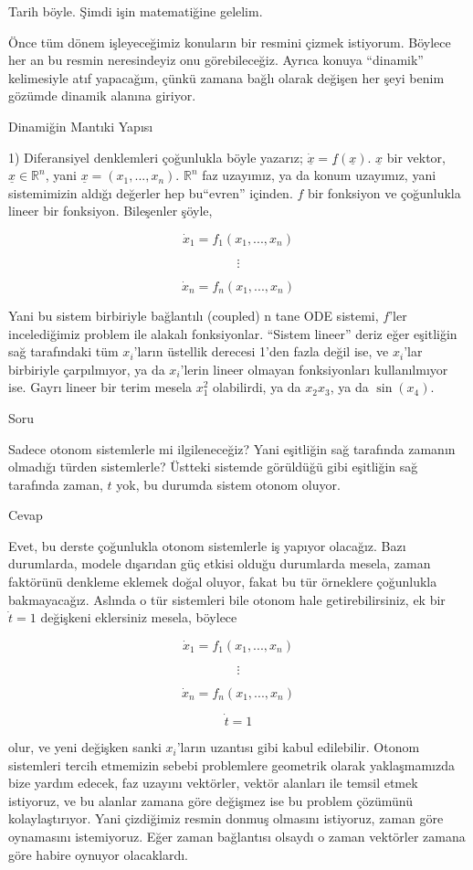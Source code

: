\documentclass[12pt,fleqn]{article}\usepackage{../../common}
\begin{document}
Tarih böyle. Şimdi işin matematiğine gelelim. 

Önce tüm dönem işleyeceğimiz konuların bir resmini çizmek istiyorum. Böylece her
an bu resmin neresindeyiz onu görebileceğiz. Ayrıca konuya ``dinamik''
kelimesiyle atıf yapacağım, çünkü zamana bağlı olarak değişen her şeyi benim
gözümde dinamik alanına giriyor.

Dinamiğin Mantıki Yapısı 

1) Diferansiyel denklemleri çoğunlukla böyle yazarız; $\dot{\underline{x}} =
\underline{f}(\underline{x}) $. $\underline{x}$ bir vektor, $ \underline{x} \in
\mathbb{R}^n$, yani $\underline{x} = (x_1,...,x_n)$. $\mathbb{R}^n$ faz uzayımız,
ya da konum uzayımız, yani sistemimizin aldığı değerler hep bu``evren''
içinden. $f$ bir fonksiyon ve çoğunlukla lineer bir fonksiyon. Bileşenler şöyle,

$$ \dot{x}_1 = f_1(x_1,...,x_n)$$

$$ \vdots $$

$$ \dot{x}_n = f_n(x_1,...,x_n)$$

Yani bu sistem birbiriyle bağlantılı (coupled) n tane ODE sistemi, $f$'ler
incelediğimiz problem ile alakalı fonksiyonlar. ``Sistem lineer'' deriz eğer
eşitliğin sağ tarafındaki tüm $x_i$'ların üstellik derecesi 1'den fazla değil
ise, ve $x_i$'lar birbiriyle çarpılmıyor, ya da $x_i$'lerin lineer olmayan
fonksiyonları kullanılmıyor ise. Gayrı lineer bir terim mesela $x_1^2$
olabilirdi, ya da $x_2x_3$, ya da $\sin(x_4)$.

Soru

Sadece otonom sistemlerle mi ilgileneceğiz? Yani eşitliğin sağ tarafında zamanın
olmadığı türden sistemlerle? Üstteki sistemde görüldüğü gibi eşitliğin sağ
tarafında zaman, $t$ yok, bu durumda sistem otonom oluyor.

Cevap

Evet, bu derste çoğunlukla otonom sistemlerle iş yapıyor olacağız. Bazı
durumlarda, modele dışarıdan güç etkisi olduğu durumlarda mesela, zaman
faktörünü denkleme eklemek doğal oluyor, fakat bu tür örneklere çoğunlukla
bakmayacağız. Aslında o tür sistemleri bile otonom hale getirebilirsiniz,
ek bir $\dot{t} = 1$ değişkeni eklersiniz mesela, böylece 

$$ \dot{x}_1 = f_1(x_1,...,x_n)$$

$$ \vdots $$

$$ \dot{x}_n = f_n(x_1,...,x_n)$$

$$ \dot{t} = 1$$

olur, ve yeni değişken sanki $x_i$'ların uzantısı gibi kabul
edilebilir. Otonom sistemleri tercih etmemizin sebebi problemlere geometrik
olarak yaklaşmamızda bize yardım edecek, faz uzayını vektörler, vektör
alanları ile temsil etmek istiyoruz, ve bu alanlar zamana göre değişmez ise
bu problem çözümünü kolaylaştırıyor. Yani çizdiğimiz resmin donmuş olmasını
istiyoruz, zaman göre oynamasını istemiyoruz. Eğer zaman bağlantısı olsaydı
o zaman vektörler zamana göre habire oynuyor olacaklardı. 
\end{document}
